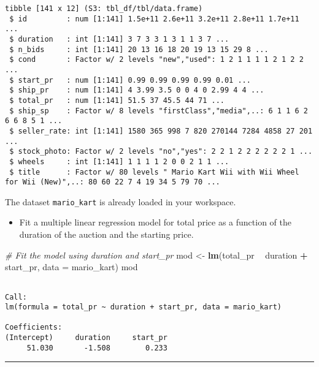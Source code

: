 \documentclass[
]{book}
\newenvironment{Shaded}{\begin{snugshade}}{\end{snugshade}}
\newcommand{\CommentTok}[1]{\textcolor[rgb]{0.56,0.35,0.01}{\textit{#1}}}
\newcommand{\DataTypeTok}[1]{\textcolor[rgb]{0.13,0.29,0.53}{#1}}
\newcommand{\KeywordTok}[1]{\textcolor[rgb]{0.13,0.29,0.53}{\textbf{#1}}}
\newcommand{\NormalTok}[1]{#1}
\newcommand{\OperatorTok}[1]{\textcolor[rgb]{0.81,0.36,0.00}{\textbf{#1}}}
\newcommand{\StringTok}[1]{\textcolor[rgb]{0.31,0.60,0.02}{#1}}
\providecommand{\tightlist}{%
  \setlength{\itemsep}{0pt}\setlength{\parskip}{0pt}}
\begin{document}
\begin{verbatim}
tibble [141 x 12] (S3: tbl_df/tbl/data.frame)
 $ id         : num [1:141] 1.5e+11 2.6e+11 3.2e+11 2.8e+11 1.7e+11 ...
 $ duration   : int [1:141] 3 7 3 3 1 3 1 1 3 7 ...
 $ n_bids     : int [1:141] 20 13 16 18 20 19 13 15 29 8 ...
 $ cond       : Factor w/ 2 levels "new","used": 1 2 1 1 1 1 2 1 2 2 ...
 $ start_pr   : num [1:141] 0.99 0.99 0.99 0.99 0.01 ...
 $ ship_pr    : num [1:141] 4 3.99 3.5 0 0 4 0 2.99 4 4 ...
 $ total_pr   : num [1:141] 51.5 37 45.5 44 71 ...
 $ ship_sp    : Factor w/ 8 levels "firstClass","media",..: 6 1 1 6 2 6 6 8 5 1 ...
 $ seller_rate: int [1:141] 1580 365 998 7 820 270144 7284 4858 27 201 ...
 $ stock_photo: Factor w/ 2 levels "no","yes": 2 2 1 2 2 2 2 2 2 1 ...
 $ wheels     : int [1:141] 1 1 1 1 2 0 0 2 1 1 ...
 $ title      : Factor w/ 80 levels " Mario Kart Wii with Wii Wheel for Wii (New)",..: 80 60 22 7 4 19 34 5 79 70 ...
\end{verbatim}

The dataset \texttt{mario\_kart} is already loaded in your workspace.

\begin{itemize}
\tightlist
\item
  Fit a multiple linear regression model for total price as a function of the duration of the auction and the starting price.
\end{itemize}

\begin{Shaded}
\begin{Highlighting}[]
\CommentTok{# Fit the model using duration and start_pr}
\NormalTok{mod <-}\StringTok{ }\KeywordTok{lm}\NormalTok{(total_pr }\OperatorTok{~}\StringTok{ }\NormalTok{duration }\OperatorTok{+}\StringTok{ }\NormalTok{start_pr, }\DataTypeTok{data =}\NormalTok{ mario_kart)}
\NormalTok{mod}
\end{Highlighting}
\end{Shaded}

\begin{verbatim}

Call:
lm(formula = total_pr ~ duration + start_pr, data = mario_kart)

Coefficients:
(Intercept)     duration     start_pr  
     51.030       -1.508        0.233  
\end{verbatim}

\begin{center}\rule{0.5\linewidth}{0.5pt}\end{center}
\end{document}
